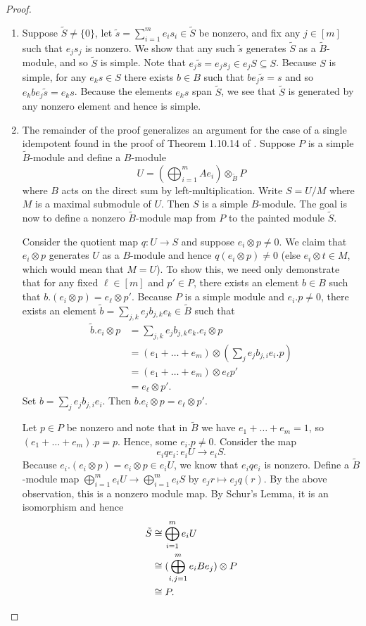\documentclass[10pt]{amsart}
\theoremstyle{definition}
\theoremstyle{definition}
\theoremstyle{plain}
\theoremstyle{remark}
\theoremstyle{plain}
\theoremstyle{plain}
\newcommand{\tB}{{\tilde{B}}}
\newcommand{\tS}{{\tilde{S}}}
\begin{document}
\begin{proof} \phantom{a}
    \begin{enumerate}
        \item Suppose $\tS\neq\{0\}$, let $\tilde{s}=\sum_{i=1}^m e_is_i\in\tS$ be nonzero, and fix any $j\in[m]$ such that $e_js_j$ is nonzero. We show that any such $\tilde{s}$ generates $\tS$ as a $\tB$-module, and so $\tS$ is simple. Note that $e_j\tilde{s}=e_js_j\in e_j S\subseteq S$. Because $S$ is simple, for any $e_ks\in S$ there exists $b\in B$ such that $be_j\tilde{s}=s$ and so $e_kb e_j\tilde{s}=e_k s$. Because the elements $e_k s$ span $\tS$, we see that $\tS$ is generated by any nonzero element and hence is simple.

        \item The remainder of the proof generalizes an argument for the case of a single idempotent found in the proof of Theorem 1.10.14 of \cite{linckelmann_2018}. Suppose $P$ is a simple $\tB$-module and define a $B$-module \[U=\left(\bigoplus_{i=1}^m Ae_i\right)\otimes_{\tB}P\] where $B$ acts on the direct sum by left-multiplication. Write $S=U/M$ where $M$ is a maximal submodule of $U$. Then $S$ is a simple $B$-module. The goal is now to define a nonzero $\tB$-module map from $P$ to the painted module $\tS$.

    Consider the quotient map $q:U\to S$ and suppose $e_i\otimes p\neq0$. We claim that $e_i\otimes p$ generates $U$ as a $B$-module and hence $q(e_i\otimes p)\neq0$ (else $e_i\otimes t\in M$, which would mean that $M=U$). To show this, we need only demonstrate that for any fixed $\ell\in[m]$ and $p'\in P$, there exists an element $b\in B$ such that $b.(e_i\otimes p)=e_\ell\otimes p'$. Because $P$ is a simple module and $e_i.p\neq0$, there exists an element  $\tilde{b}=\sum_{j,k}e_jb_{j,k}e_k\in \tB$ such that \begin{align*}
        \tilde{b}.e_i\otimes p&=\sum_{j,k}e_jb_{j,k}e_k.e_i\otimes p\\
        &=(e_1+\dots+e_m)\otimes (\sum_{j}e_jb_{j,i}e_i.p)\\
        &=(e_1+\dots+e_m)\otimes e_\ell p'\\
        &=e_\ell\otimes p'.
    \end{align*} Set $b=\sum_{j}e_jb_{j,i}e_i$. Then $b.e_i\otimes p=e_\ell\otimes p'$.

    Let $p\in P$ be nonzero and note that in $\tB$ we have $e_1+\dots+e_m=1$, so $(e_1+\dots+e_m).p=p$. Hence, some $e_i.p\neq0$. Consider the map \[e_i q e_i:e_iU\to e_i S.\] Because $e_i.(e_i\otimes p)=e_i\otimes p \in e_i U$, we know that $e_i q e_i$ is nonzero.  Define a $\tB$-module map $\bigoplus_{i=1}^m e_iU\to\bigoplus_{i=1}^m e_iS$ by $e_jr\mapsto e_j q(r)$. By the above observation, this is a nonzero module map. By Schur's Lemma, it is an isomorphism and hence \begin{align*}
        \tS&\cong \bigoplus_{i=1}^m e_iU\\
        &\cong(\bigoplus_{i,j=1}^m e_iBe_j)\otimes P\\
        &\cong P. \qedhere
    \end{align*}
    \end{enumerate}
\end{proof}
\end{document}
